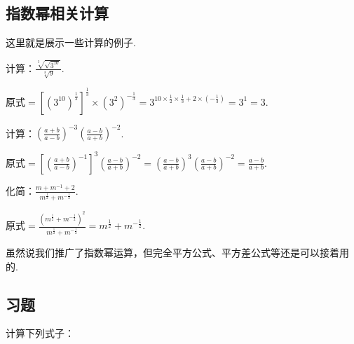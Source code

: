 \documentclass[lang=cn,math=cm,chinesefont=nofont,11pt,scheme=chinese,twocol]{elegantbook}
\begin{document}
\subsection{指数幂相关计算}

这里就是展示一些计算的例子.

\begin{example}\label{exp:2017RJB_bx2_P7.2.1}
  计算：$\frac{\sqrt[3]{\sqrt{3^{10}}}}{\sqrt[3]{9}}$.
\end{example}

\begin{solution}
  $\text{原式}=\left[\left(3^{10}\right)^{\frac12}\right]^{\frac13}\times\left(3^2\right)^{-\frac13}=3^{10\times\frac12\times\frac13+2\times\left(-\frac13\right)}=3^1=3.$
\end{solution}

\begin{example}\label{exp:ZXSXSYJC_reformatted_3_P7.1.4.3}
  计算：$\left(\frac{a+b}{a-b}\right)^{-3}\left(\frac{a-b}{a+b}\right)^{-2}$.
\end{example}

\begin{solution}
  $\text{原式}=\left[\left(\frac{a+b}{a-b}\right)^{-1}\right]^3\left(\frac{a-b}{a+b}\right)^{-2}=\left(\frac{a-b}{a+b}\right)^3\left(\frac{a-b}{a+b}\right)^{-2}=\frac{a-b}{a+b}.$
\end{solution}

\begin{example}\label{2017RJB_bx2_P7.3.2}
  化简：$\frac{m+m^{-1}+2}{m^{\frac12}+m^{-\frac12}}$.
\end{example}

\begin{solution}
  $\text{原式}=\frac{(m^\frac12+m^{-\frac12})^2}{m^\frac12+m^{-\frac12}}=m^\frac12+m^{-\frac12}.$
\end{solution}

虽然说我们推广了指数幂运算，但完全平方公式、平方差公式等还是可以接着用的.

\subsection{习题}

\begin{exercise}
  计算下列式子：
\end{exercise}
\end{document}

